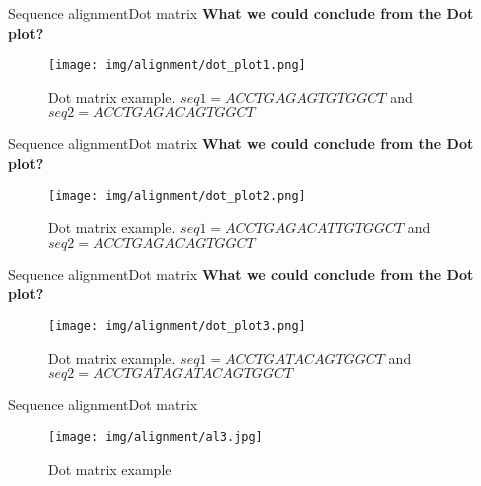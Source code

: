 \documentclass[10pt]{beamer}
\newcommand{\1}{
	\setbeamertemplate{background}{
		\texttt{[image: img/1]}
		\tikz[overlay] \fill[fill opacity=0.75,fill=white] (0,0) rectangle (-\paperwidth,\paperheight);
	}
}
\begin{document}
\begin{frame}{Sequence alignment}{Dot matrix}
	\centering
	\textbf{What we could conclude from the Dot plot?}	 
	\begin{figure}[]		
		\texttt{[image: img/alignment/dot\_plot1.png]}
		\label{img:uniprot}
		\caption{Dot matrix example. $seq1 = ACCTGAGAGTGTGGCT$ and $seq2 = ACCTGAGACAGTGGCT$}
	\end{figure}
\end{frame}

\begin{frame}{Sequence alignment}{Dot matrix}
	\centering
	\textbf{What we could conclude from the Dot plot?}	 
	\begin{figure}[]		
		\texttt{[image: img/alignment/dot\_plot2.png]}
		\label{img:uniprot}
		\caption{Dot matrix example. $seq1 = ACCTGAGACATTGTGGCT$ and $seq2 = ACCTGAGACAGTGGCT$}
	\end{figure}
\end{frame}

\begin{frame}{Sequence alignment}{Dot matrix}
	\centering
	\textbf{What we could conclude from the Dot plot?}	 
	\begin{figure}[]		
		\texttt{[image: img/alignment/dot\_plot3.png]}
		\label{img:uniprot}
		\caption{Dot matrix example. $seq1 = ACCTGATACAGTGGCT$ and $seq2 = ACCTGATAGATACAGTGGCT$}
	\end{figure}
\end{frame}

\begin{frame}{Sequence alignment}{Dot matrix}
	
	\begin{figure}[]
		\centering
		\texttt{[image: img/alignment/al3.jpg]}
		\label{img:uniprot}
		\caption{Dot matrix example}
	\end{figure}
\end{frame}
\end{document}
